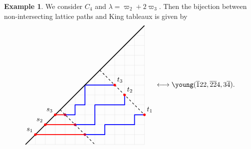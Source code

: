 \documentclass[11pt, leqno]{amsart}
\theoremstyle{plain}
\theoremstyle{definition}
\newtheorem{example}[theorem]{Example}
\numberwithin{equation}{section}
\newcommand{\fw}{\varpi} %
\newcommand{\ofour}{\overline{4}}
\newcommand{\otwo}{\overline{2}}
\newcommand{\one}{\overline{1}}
\newcommand{\dyckgrid}[1]{
\foreach \i in {0, ..., #1} {\draw[gray!40, very thin] (\i,\i) -- (#1, \i); \draw[gray!40, very thin] (\i,\i) -- (\i, 0);}
}
\begin{document}
\begin{example}
We consider $C_4$ and $\lambda = \fw_2 + 2\fw_3$.
Then the bijection between non-intersecting lattice paths and King tableaux is given by
\[
\begin{tikzpicture}[scale=0.5, baseline=83]
\dyckgrid{12}
\draw[very thick, blue, line join=round] (4,3) -- (5,3) -- (5,4) -- (6,4) -- (6,6) -- (9,6);
\draw[very thick, blue, line join=round] (5,2) -- (7,2) -- (7,4) -- (10,4) -- (10,5);
\draw[very thick, blue, line join=round] (6,1) -- (8,1) -- (8,2) -- (11,2) -- (11,3) -- (12,3);
\draw[very thick,-] (0,0) -- (12,12);
\draw[thick,dashed] (3.5,3.5) -- +(3.5, -3.5);
\draw[thick,dashed] (7.5,7.5) -- +(4.5, -4.5);
\foreach \i in {1,2,3}
  \draw[very thick, red] (\i, \i) -- +(7-2*\i, 0);
\foreach \i in {1,2,3}
  \draw[fill=purple, color=purple] (3+\i, 4-\i) circle (0.12);
\foreach \i in {1,2,3}
{
  \draw[fill=red, color=red] (\i, \i) circle (0.12);
  \draw (\i, \i) node[anchor=south east] {$s_{\i}$};
}
\foreach \i in {2,3,5} { \draw[fill=red, color=red] (7+\i, 8-\i) circle (0.12); }
\draw (8+1, 8-2) node[anchor=south west] {$t_3$};
\draw (8+2, 8-3) node[anchor=south west] {$t_2$};
\draw (8+4, 8-5) node[anchor=south west] {$t_1$};
\end{tikzpicture}
\longleftrightarrow
\young(\one22,\otwo\otwo4,3\ofour).
\]
\end{example}
\end{document}
